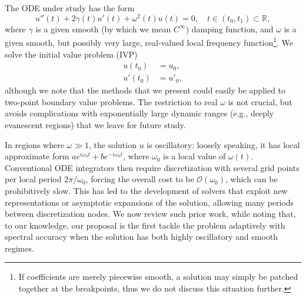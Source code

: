 \documentclass[10pt]{article}
\newcommand{\be}{\begin{equation}}
\newcommand{\ee}{\end{equation}}
\newcommand{\ba}{\begin{align}}
\newcommand{\ea}{\end{align}}
\newcommand{\R}{\mathbb{R}}
\newcommand{\bigO}{{\mathcal O}}
\newcommand{\om}{\omega}
\newcommand{\g}{\gamma}
\begin{document}
The ODE under study has the form
\be
u''(t) + 2\g(t) u'(t) + \om^2(t)u(t) = 0, \quad t \in (t_0,t_1) \subset \R,
\label{ode}
\ee
where $\g$ is a given smooth (by which we mean $C^\infty$) damping function,
and $\om$ is a given smooth, but possibly very large, real-valued
local frequency function\footnote{If coefficients are merely piecewise smooth, a solution may simply be patched together at the breakpoints, thus we do not discuss this situation further.}.
We solve the initial value problem (IVP)
\begin{align} %
    u(t_0) &= u_0, \label{ic0} \\
    u'(t_0) &= u'_0, \label{ic1}
\end{align}
although we note that the methods that we present could easily be applied to
two-point boundary value problems.
The restriction to real $\om$ is not crucial,
but avoids complications with exponentially large dynamic ranges
(e.g., deeply evanescent regions)
that we leave for future study.
%

In regions where $\om \gg 1$,
the solution $u$ is oscillatory:
loosely speaking,
it has local approximate form $a e^{i\om_0t} + b e^{-i\om_0t}$, where $\om_0$
is a local value of $\om(t)$.
Conventional ODE integrators then require discretization with several
grid points per local period $2\pi/\om_0$, forcing the overall
cost to be $\bigO(\om_0)$, which can be prohibitively slow.
This has led to the development of solvers
that exploit new representations or asymptotic expansions of the solution, allowing many periods between discretization nodes.
We now review such prior work,
while noting that, to our knowledge, our proposal is the first
tackle the problem adaptively with spectral accuracy
when the solution has both highly oscillatory and smooth regimes.
\end{document}
